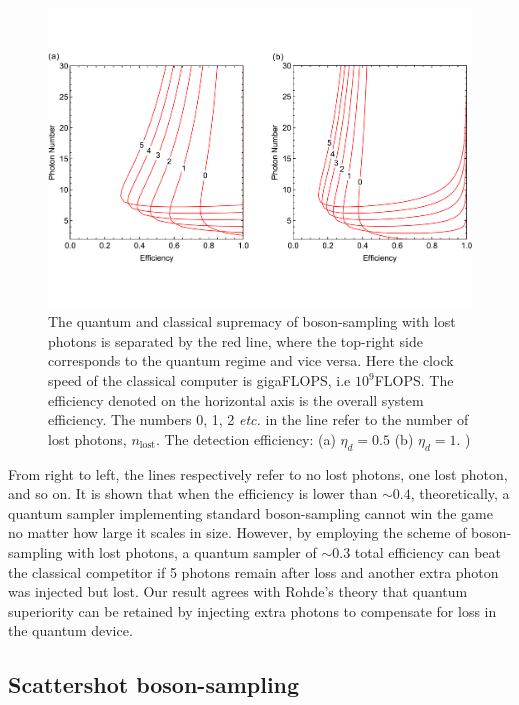 \documentclass[aps,rmp,twocolumn,amsmath,amssymb,nofootinbib,superscriptaddress]{revtex4}
\newcommand{\comment}[1]{{\color{blue}{#1}}}
\begin{document}
\begin{figure}[!htb]
\includegraphics[width=\columnwidth]{curves_loss}
\caption{The quantum and classical supremacy of boson-sampling with lost photons is separated by the red line, where the top-right side corresponds to the quantum regime and vice versa. Here the clock speed of the classical computer is gigaFLOPS, i.e $10^9$FLOPS. The efficiency denoted on the horizontal axis is the overall system efficiency. The numbers 0, 1, 2 \emph{etc.} in the line refer to the number of lost photons, $n_\mathrm{lost}$. The detection efficiency: (a) \mbox{$\eta_d=0.5$} (b) \mbox{$\eta_d=1$}. \comment{(Why does the curve have the change in direction?})} \label{fig:curve_hybrid}
\end{figure}

From right to left, the lines respectively refer to no lost photons, one lost photon, and so on. It is shown that when the efficiency is lower than $\sim 0.4$, theoretically, a quantum sampler implementing standard boson-sampling cannot win the game no matter how large it scales in size. However, by employing the scheme of boson-sampling with lost photons, a quantum sampler of $\sim 0.3$ total efficiency can beat the classical competitor if 5 photons remain after loss and another extra photon was injected but lost. Our result agrees with Rohde's theory \cite{bib:22} that quantum superiority can be retained by injecting extra photons to compensate for loss in the quantum device.

\subsection{Scattershot boson-sampling}
\end{document}
